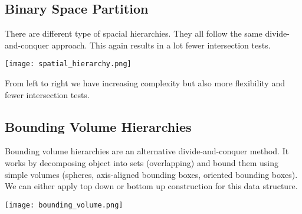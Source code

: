 \subsection{Binary Space Partition}

There are different type of spacial hierarchies. They all follow the same divide-and-conquer approach. This again results in a lot fewer intersection tests.
\begin{center}
	\texttt{[image: spatial\_hierarchy.png]}
\end{center}
From left to right we have increasing complexity but also more flexibility and fewer intersection tests.


\subsection{Bounding Volume Hierarchies}

Bounding volume hierarchies are an alternative divide-and-conquer method. It works by decomposing object into sets (overlapping) and bound them using simple volumes (spheres, axis-aligned bounding boxes, oriented bounding boxes). We can either apply top down or bottom up construction for this data structure.
\begin{center}
	\texttt{[image: bounding\_volume.png]}
\end{center}